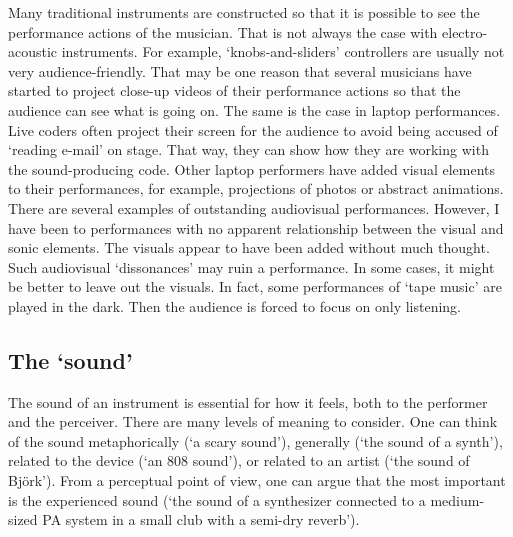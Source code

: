 Many traditional instruments are constructed so that it is possible to see the performance actions of the musician. That is not always the case with electro-acoustic instruments. For example, `knobs-and-sliders' controllers are usually not very audience-friendly. That may be one reason that several musicians have started to project close-up videos of their performance actions so that the audience can see what is going on. The same is the case in laptop performances. Live coders often project their screen for the audience to avoid being accused of `reading e-mail' on stage. That way, they can show how they are working with the sound-producing code. Other laptop performers have added visual elements to their performances, for example, projections of photos or abstract animations. There are several examples of outstanding audiovisual performances. However, I have been to performances with no apparent relationship between the visual and sonic elements. The visuals appear to have been added without much thought. Such audiovisual `dissonances' may ruin a performance. In some cases, it might be better to leave out the visuals. In fact, some performances of `tape music' are played in the dark. Then the audience is forced to focus on only listening.


\subsection{The `sound'}

The sound of an instrument is essential for how it feels, both to the performer and the perceiver. There are many levels of meaning to consider. One can think of the sound metaphorically (`a scary sound'), generally (`the sound of a synth'), related to the device (`an 808 sound'), or related to an artist (`the sound of Björk'). From a perceptual point of view, one can argue that the most important is the experienced sound (`the sound of a synthesizer connected to a medium-sized PA system in a small club with a semi-dry reverb').


